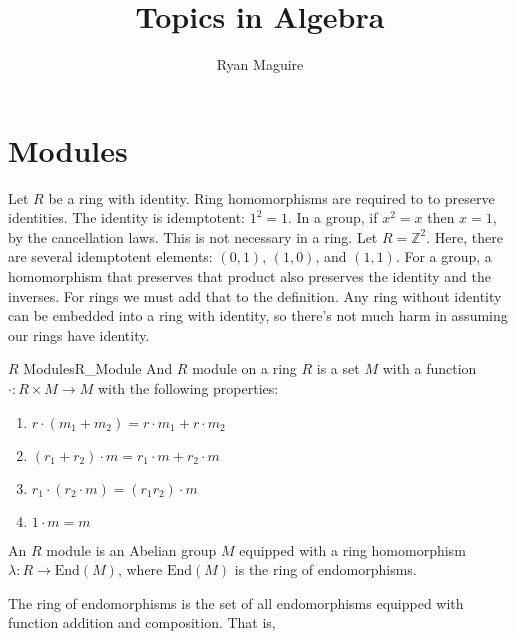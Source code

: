\documentclass[crop=false,class=article]{standalone}                       %
\begin{document}
    \title{Topics in Algebra}
    \author{Ryan Maguire}
    \date{\vspace{-5ex}}
    \maketitle
    \tableofcontents
    \clearpage
    \vspace{10ex}
    \section{Modules}
        Let $R$ be a ring with identity. Ring homomorphisms are required to
        to preserve identities. The identity is idemptotent:
        $1^{2}=1$. In a group, if $x^{2}=x$ then $x=1$, by the cancellation
        laws. This is not necessary in a ring. Let $R=\mathbb{Z}^{2}$. Here,
        there are several idemptotent elements: $(0,1)$, $(1,0)$, and
        $(1,1)$. For a group, a homomorphism that preserves that product
        also preserves the identity and the inverses. For rings we must
        add that to the definition. Any ring without identity can be
        embedded into a ring with identity, so there's not much harm in
        assuming our rings have identity.
        \begin{ldefinition}{$R$ Modules}{R_Module}
            And $R$ module on a ring $R$ is a set $M$ with a function
            $\cdot:R\times{M}\rightarrow{M}$ with the following properties:
            \begin{enumerate}
                \item $r\cdot(m_{1}+m_{2})=r\cdot{m}_{1}+r\cdot{m}_{2}$
                \item $(r_{1}+r_{2})\cdot{m}=r_{1}\cdot{m}+r_{2}\cdot{m}$
                \item $r_{1}\cdot(r_{2}\cdot{m})=(r_{1}r_{2})\cdot{m}$
                \item $1\cdot{m}=m$
            \end{enumerate}
        \end{ldefinition}
        \begin{theorem}
            An $R$ module is an Abelian group $M$ equipped with a ring
            homomorphism $\lambda:R\rightarrow\textrm{End}(M)$, where
            $\textrm{End}(M)$ is the ring of endomorphisms.
        \end{theorem}
        The ring of endomorphisms is the set of all endomorphisms equipped
        with function addition and composition. That is,
\end{document}
